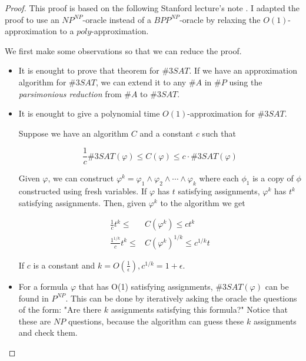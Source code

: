 \documentclass[12pt, a4paper]{article} %
\theoremstyle{definition}
\begin{document}
\begin{proof}

  This proof is based on the following Stanford lecture's note \cite{lecture}. I adapted the proof to use an $NP^{NP}$-oracle instead of a $BPP^{NP}$-oracle by relaxing the $O(1)$-approximation to a $poly$-approximation.

  We first make some observations so that we can reduce the proof.

  \begin{itemize}
    \item It is enought to prove that theorem for $\#3SAT$. If we have an approximation algorithm for $\#3SAT$, we can extend it to any $\#A$ in $\#P$ using the \textit{parsimonious reduction} from $\#A$ to $\#3SAT$.
    \item It is enought to give a polynomial time $O(1)$-approximation for $\#3SAT$.

          Suppose we have an algorithm $C$ and a constant $c$ such that

          \begin{equation}\label{eq:2}
            \frac{1}{c}\#3SAT(\varphi) \leq C(\varphi) \leq c \cdot \#3SAT(\varphi)
          \end{equation}

          Given $\varphi$, we can construct $\varphi^k = \varphi_1 \land \varphi_2 \land \cdots \land \varphi_k$ where each $\phi_1$ is a copy of $\phi$ constructed using fresh variables. If $\varphi$ has $t$ satisfying assignments, $\varphi^k$ has $t^k$ satisfying assignments. Then, given $\varphi^k$ to the algorithm we get

          \begin{align*}
            \frac{1}{c}t^k \leq &C(\varphi^k) \leq ct^k \\
            \frac{1^{1/k}}{c}t^k \leq &C(\varphi^k)^{1/k} \leq c^{1/k}t
          \end{align*}

          If $c$ is a constant and $k = O(\frac{1}{\epsilon}), c^{1/k} = 1 + \epsilon$.

        \item For a formula $\varphi$ that has O(1) satisfying assignments, $\#3SAT(\varphi)$ can be found in $P^{NP}$. This can be done by iteratively asking the oracle the questions of the form: "Are there $k$ assignments satisfying this formula?" Notice that these are $NP$ questions, because the algorithm can guess these $k$ assignments and check them.
  \end{itemize}


\end{proof}
\end{document}
